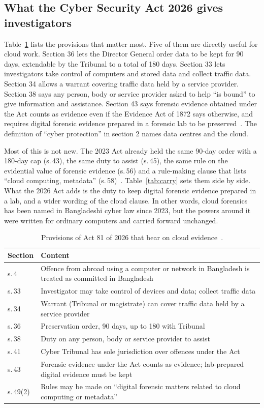 \documentclass[conference]{IEEEtran}
\begin{document}
\subsection{What the Cyber Security Act 2026 gives investigators}
Table~\ref{tab:laws} lists the provisions that matter most. Five of them are directly useful for cloud work. Section 36 lets the Director General order data to be kept for 90 days, extendable by the Tribunal to a total of 180 days. Section 33 lets investigators take control of computers and stored data and collect traffic data. Section 34 allows a warrant covering traffic data held by a service provider. Section 38 says any person, body or service provider asked to help ``is bound'' to give information and assistance. Section 43 says forensic evidence obtained under the Act counts as evidence even if the Evidence Act of 1872 says otherwise, and requires digital forensic evidence prepared in a forensic lab to be preserved~\cite{cyberact}. The definition of ``cyber protection'' in section 2 names data centres and the cloud.

Most of this is not new. The 2023 Act already held the same 90-day order with a 180-day cap (s.\,43), the same duty to assist (s.\,45), the same rule on the evidential value of forensic evidence (s.\,56) and a rule-making clause that lists ``cloud computing, metadata'' (s.\,58)~\cite{act2023}. Table~\ref{tab:carry} sets them side by side. What the 2026 Act adds is the duty to keep digital forensic evidence prepared in a lab, and a wider wording of the cloud clause. In other words, cloud forensics has been named in Bangladeshi cyber law since 2023, but the powers around it were written for ordinary computers and carried forward unchanged.

\begin{table}[t]
\centering
\caption{Provisions of Act 81 of 2026 that bear on cloud evidence~\cite{cyberact}.}
\label{tab:laws}
\small
\renewcommand{\arraystretch}{1.05}
\begin{tabularx}{\columnwidth}{@{}l X@{}}
\toprule
Section & Content \\
\midrule
s.\,4 & Offence from abroad using a computer or network in Bangladesh is treated as committed in Bangladesh \\
s.\,33 & Investigator may take control of devices and data; collect traffic data \\
s.\,34 & Warrant (Tribunal or magistrate) can cover traffic data held by a service provider \\
s.\,36 & Preservation order, 90 days, up to 180 with Tribunal \\
s.\,38 & Duty on any person, body or service provider to assist \\
s.\,41 & Cyber Tribunal has sole jurisdiction over offences under the Act \\
s.\,43 & Forensic evidence under the Act counts as evidence; lab-prepared digital evidence must be kept \\
s.\,49(2) & Rules may be made on ``digital forensic matters related to cloud computing or metadata'' \\
\bottomrule
\end{tabularx}
\end{table}
\end{document}
